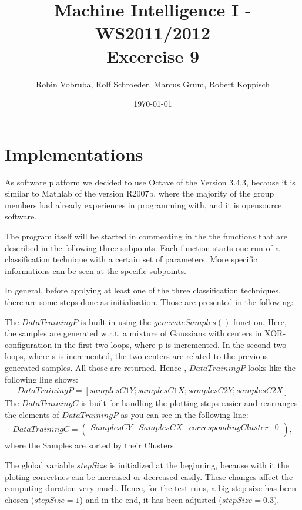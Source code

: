\documentclass[a4paper,headings=small]{scrartcl}
\title{Machine Intelligence I - WS2011/2012\\Excercise 9}
\author{Robin Vobruba, Rolf Schroeder, Marcus Grum, Robert Koppisch}
\date{\today}
\begin{document}
\maketitle

\section{Implementations}
As software platform we decided to use Octave of the Version 3.4.3,
because it is similar to Mathlab of the version R2007b,
where the majority of the group members had already experiences in programming with, and it is opensource software.

The program itself will be started in commenting in the the functions
that are described in the following three subpoints.
Each function starts one run of a classification technique with a certain set of parameters.
More specific informations can be seen at the specific subpoints.

In general, before applying at least one of the three classification techniques,
there are some steps done as initialisation. Those are presented in the following:

The $DataTrainingP$ is built in using the $generateSamples()$ function.
Here, the samples are generated w.r.t. a mixture of Gaussians with centers in XOR-configuration
in the first two loops, where p is incremented.
In the second two loops, where s is incremented, the two centers are related to the previous generated samples.
All those are returned. Hence , $DataTrainingP$ looks like the following line shows:
\begin{align}
DataTrainingP = [samplesC1Y; samplesC1X; samplesC2Y; samplesC2X]
\end{align}
The $DataTrainingC$ is built for handling the plotting steps easier and rearranges the elements
of $DataTrainingP$ as you can see in the following line:
\begin{align}
DataTrainingC = 
\left(
\begin{array}{cccc}
	SamplesCY & SamplesCX & corresponding Cluster	& 0\\
\end{array}
\right),
\end{align} where the Samples are sorted by their Clusters.

The global variable $stepSize$ is initialized at the beginning,
because with it the ploting correctnes can be increased or decreased easily.
These changes affect the computing duration very much.
Hence, for the test runs, a big step size has been chosen ($stepSize = 1$) and in the end, it has been adjusted ($stepSize = 0.3$).
\end{document}
